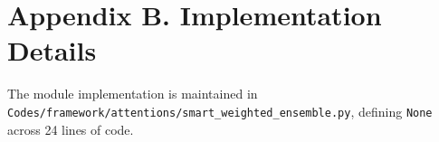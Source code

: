 \section*{Appendix B. Implementation Details}
The module implementation is maintained in \texttt{Codes/framework/attentions/smart\_weighted\_ensemble.py}, defining \texttt{None} across 24 lines of code.
